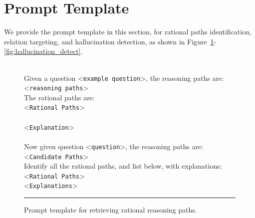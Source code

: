 \section{Prompt Template}
\label{prompt_template}
We provide the prompt template in this section, for rational paths identification, relation targeting, and hallucination detection, as shown in Figure~\ref{fig:get_rational_paths}-\ref{fig:hallucination_detect}.
\begin{figure}[!t]
\begin{tcolorbox}[colback=gray!5!white,
                  colframe=gray!75!black,
                  title=Prompt template for identifying rational paths]
\scriptsize

 \\ [5pt]
Given a question <\texttt{example question}>, the reasoning paths are: \\[5pt]

<\texttt{reasoning paths}> \\ [5pt]

The rational paths are: \\ [3pt]

<\texttt{Rational Paths}> \\ [5pt]

 \\ [3pt]

<\texttt{Explanation}> \\ [5pt]

 \\ [5pt]

Now given question <\texttt{question}>, the reasoning paths are: \\ [5pt]

<\texttt{Candidate Paths}> \\ [5pt]

Identify all the rational paths, and list below, with explanations: \\ [5pt]

<\texttt{Rational Paths}> \\ [3pt]

<\texttt{Explanations}> \\ [3pt]

\rule{\linewidth}{0.4pt}
\end{tcolorbox}
\caption{Prompt template for retrieving rational reasoning paths.}
\label{fig:get_rational_paths}
\end{figure}


